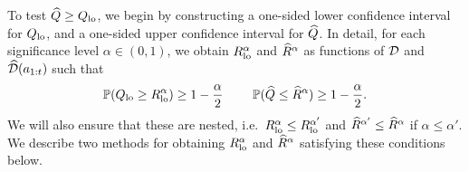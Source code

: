 




To test $\widehat{Q} \geq Q_{\mathrm{lo}}$, we begin by constructing a one-sided lower confidence interval for $Q_{\mathrm{lo}}$, and a one-sided upper confidence interval for $\widehat{Q}$.
In detail, for each significance level $\alpha \in (0, 1)$, we obtain $R_{\mathrm{lo}}^{\alpha}$ and $\widehat{R}^{\alpha}$ as functions of $\mathcal{D}$ and $\widehat{\mathcal{D}}(a_{1:t})$ such that
\begin{equation}
    \mathbb{P}(Q_{\mathrm{lo}} \geq R_{\mathrm{lo}}^{\alpha}) \geq 1 - \frac{\alpha}{2} \qquad\,\, \mathbb{P}(\widehat{Q} \leq \widehat{R}^{\alpha}) \geq 1 - \frac{\alpha}{2}. \label{eq:q-confidence-interval-new}
\end{equation}
We will also ensure that these are nested, i.e.\ $R_{\mathrm{lo}}^{\alpha} \leq R_{\mathrm{lo}}^{\alpha'}$ and $\widehat{R}^{\alpha'} \leq \widehat{R}^{\alpha}$ if $\alpha \leq \alpha'$.
We describe two methods for obtaining $R_{\mathrm{lo}}^{\alpha}$ and $\widehat{R}^{\alpha}$ satisfying these conditions below.

